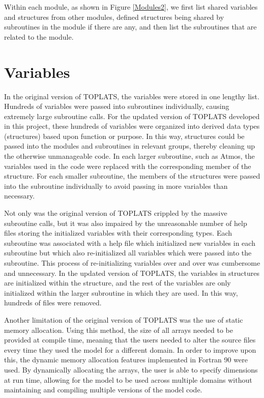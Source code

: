 \documentclass[pdftex,12pt,a4paper]{article}
\begin{document}
Within each module, as shown in Figure \ref{Modules2}, we first list shared variables and structures from other modules, defined structures being shared by subroutines in the module if there are any, and then list the subroutines that are related to the module. 

\section{Variables}
In the original version of TOPLATS, the variables were stored in one lengthy list. Hundreds of variables were passed into subroutines individually, causing extremely large subroutine calls. For the updated version of TOPLATS developed in this project, these hundreds of variables were organized into derived data types (structures) based upon function or purpose. In this way, structures could be passed into the modules and subroutines in relevant groups, thereby cleaning up the otherwise unmanageable code. In each larger subroutine, such as Atmos, the variables used in the code were replaced with the corresponding member of the structure. For each smaller subroutine, the members of the structures were passed into the subroutine individually to avoid passing in more variables than necessary.

Not only was the original version of TOPLATS crippled by the massive subroutine calls, but it was also impaired by the unreasonable number of help files storing the initialized variables with their corresponding types. Each subroutine was associated with a help file which initialized new variables in each subroutine but which also re-initialized all variables which were passed into the subroutine. This process of re-initializing variables over and over was cumbersome and unnecessary. In the updated version of TOPLATS, the variables in structures are initialized within the structure, and the rest of the variables are only initialized within the larger subroutine in which they are used. In this way, hundreds of files were removed.

Another limitation of the original version of TOPLATS was the use of static memory allocation. Using this method, the size of all arrays needed to be provided at compile time, meaning that the users needed to alter the source files every time they used the model for a different domain. In order to improve upon this, the dynamic memory allocation features implemented in Fortran 90 were used. By dynamically allocating the arrays, the user is able to specify dimensions at run time, allowing for the model to be used across multiple domains without maintaining and compiling multiple versions of the model code.
\end{document}
